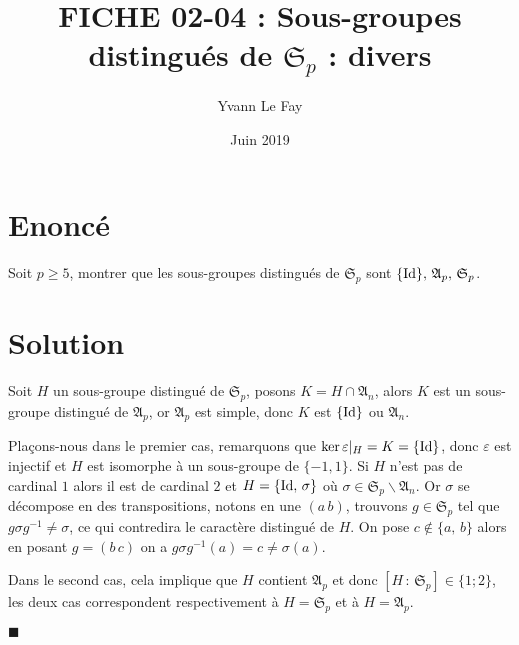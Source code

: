 \documentclass{article}
\newcommand*{\QED}{\hfill\ensuremath{\blacksquare}}%
\begin{document}
\title{FICHE 02-04 : Sous-groupes distingués de $\mathfrak{S}_p$ : divers}
\author{Yvann Le Fay}
\date{Juin 2019}
\maketitle
\section*{Enoncé}
Soit $p\geq 5$, montrer que les sous-groupes distingués de $\mathfrak{S}_p$ sont $\{\textup{Id}\},\, \mathfrak{A}_p,\, \mathfrak{S}_p$.

\section*{Solution}
Soit $H$ un sous-groupe distingué de $\mathfrak{S}_p$, posons $K=H\cap \mathfrak{A}_n$, alors $K$ est un sous-groupe distingué de $\mathfrak{A}_p$, or $\mathfrak{A}_p$ est simple, donc $K$ est $\{\textup{Id}\}$ ou $\mathfrak{A}_n$. 

Plaçons-nous dans le premier cas, remarquons que $\ker \varepsilon|_{H} = K = \{\textup{Id}\}$, donc $\varepsilon$ est injectif et $H$ est isomorphe à un sous-groupe de $\{-1,1\}$. Si $H$ n'est pas de cardinal $1$ alors il est de cardinal $2$ et $H = \{\textup{Id},\, \sigma\}$ où $\sigma\in \mathfrak{S}_p\backslash\mathfrak{A}_n$. Or $\sigma$ se décompose en des transpositions, notons en une $(a\, b)$, trouvons $g\in\mathfrak{S}_p$ tel que $g\sigma g^{-1}\neq \sigma$, ce qui contredira le caractère distingué de $H$. On pose $c\notin\{a,\,b\}$ alors en posant $g=(b\, c)$ on a $g\sigma g^{-1}(a) = c \neq \sigma(a)$.

 
Dans le second cas, cela implique que $H$ contient $\mathfrak{A}_p$ et donc $[H\,:\,\mathfrak{S}_p]\in\{1;2\}$, les deux cas correspondent respectivement à $H = \mathfrak{S}_p$ et à $H = \mathfrak{A}_p$.

\QED
\end{document}
